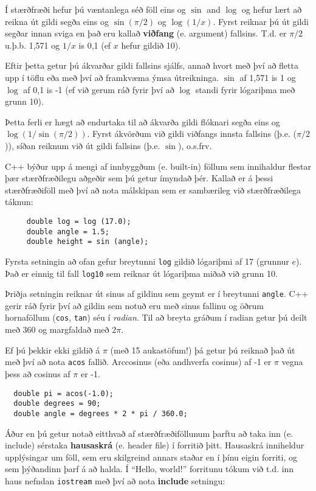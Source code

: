 Í stærðfræði hefur þú væntanlega séð föll eins og $\sin$ and $\log$ og hefur lært að reikna út gildi segða eins og $\sin(\pi/2)$ og $\log(1/x)$.
Fyrst reiknar þú út gildi segðar innan sviga en það eru kallað {\bf viðfang} (e. argument) fallsins.
T.d. er $\pi/2$ u.þ.b. 1,571 og $1/x$ is 0,1 (ef $x$ hefur gildið 10).

Eftir þetta getur þú ákvarðar gildi fallsins sjálfs, annað hvort með því að fletta upp í töflu eða með því að framkvæma ýmsa útreikninga.
$\sin$ af 1,571 is 1 og $\log$ af 0,1 is -1 (ef við gerum ráð fyrir því að $\log$ standi fyrir 
lógariþma með grunn 10).

Þetta ferli er hægt að endurtaka til að ákvarða gildi flóknari segða eins og $\log(1/\sin(\pi/2))$.
Fyrst ákvörðum við gildi viðfangs innsta fallsins (þ.e. ($\pi/2$)), síðan reiknum við út gildi fallsins (þ.e. $\sin$), o.s.frv.

C++ býður upp á mengi af innbyggðum (e. built-in) föllum sem innihaldur flestar þær stærðfræðilegu aðgeðir sem þú getur ímyndað þér.
Kallað er á þessi stærðfræðiföll með því að nota málskipan sem er sambærileg við stærðfræðilega táknun: 

\begin{verbatim}
     double log = log (17.0);
     double angle = 1.5;
     double height = sin (angle);
\end{verbatim}
%
Fyrsta setningin að ofan gefur breytunni {\tt log} gildið lógariþmi af 17 (grunnur $e$).
Það er einnig til fall {\tt log10} sem reiknar út lógariþma miðað við grunn 10.

Þriðja setningin reiknar út sinus af gildinu sem geymt er í breytunni {\tt angle}.
C++ gerir ráð fyrir því að gildin sem notuð eru með sinus fallinu og öðrum hornaföllum ({\tt cos}, {\tt tan}) séu í {\em radian}.
Til að breyta gráðum í radian getur þú deilt með 360 og margfaldað með $2 \pi$.  

Ef þú þekkir ekki gildið á $\pi$ (með 15 aukastöfum!) þá getur þú reiknað það út með því að nota {\tt acos} fallið.
Arccosinus (eða andhverfa cosinus) af -1 er $\pi$ vegna þess að cosinus af $\pi$ er -1.

\begin{verbatim}
  double pi = acos(-1.0);
  double degrees = 90;
  double angle = degrees * 2 * pi / 360.0;
\end{verbatim}
%
Áður en þú getur notað eitthvað af stærðfræðiföllunum þarftu að taka inn (e. include) sérstaka {\bf hausaskrá} (e. header file) í forritið þitt.
Hausaskrá inniheldur upplýsingar um föll, sem eru skilgreind annars staðar en í þínu eigin forriti, og sem þýðandinn þarf á að halda.
Í ``Hello, world!'' forritunu tókum við t.d. inn haus nefndan {\tt iostream} með því að nota {\bf include} setningu:

